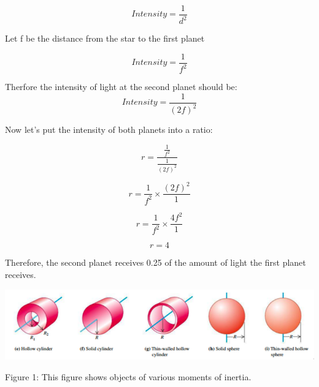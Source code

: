 \documentclass[12pt]{article}
\begin{document}
\begin{enumerate}
        \begin{equation}
        Intensity = \frac{1}{d^{2}}
        \end{equation}

        Let f be the distance from the star to the first planet\newline

        \begin{equation}
        Intensity = \frac{1}{f^{2}}
        \end{equation}

        Therfore the intensity of light at the second planet should be:
        \begin{equation}
        Intensity = \frac{1}{(2f)^{2}}
        \end{equation}

        Now let's put the intensity of both planets into a ratio:

        \begin{equation}
            r = \frac{\frac{1}{f^{2}}}{\frac{1}{(2f)^{2}}}
        \end{equation}

        \begin{equation}
            r = \frac{1}{f^{2}} \times \frac{(2f)^{2}}{1}
        \end{equation}

        \begin{equation}
            r = \frac{1}{f^{2}} \times \frac{4f^{2}}{1}
        \end{equation}

        \begin{equation}
            r = 4
        \end{equation}

        Therefore, the second planet receives 0.25 of the amount of light the first planet receives.


        \begin{center}
        \includegraphics[scale=0.55]{a6f1}

        Figure 1: This figure shows objects of various moments of inertia.
        \end{center}



\end{enumerate}
\end{document}
